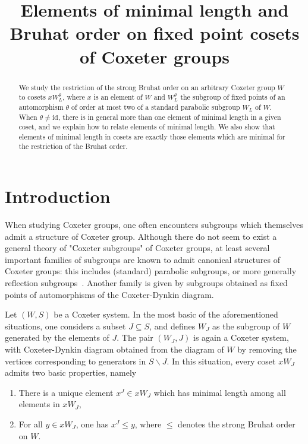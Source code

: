 \documentclass[ALCO, Unicode]{cedram}
\title[Elements of minimal length and Bruhat order on fixed point cosets]{Elements of minimal length and Bruhat order on fixed point cosets of Coxeter groups}
\author{\firstname{Nathan} \lastname{Chapelier-Laget}}
\author{\firstname{Thomas} \lastname{Gobet}}
\begin{document}
\begin{abstract}
We study the restriction of the strong Bruhat order on an arbitrary Coxeter group $W$ to cosets $x W_L^\theta$, where $x$ is an element of $W$ and $W_L^\theta$ the subgroup of fixed points of an automorphism $\theta$ of order at most two of a standard parabolic subgroup $W_L$ of $W$. When $\theta\neq\mathrm{id}$, there is in general more than one element of minimal length in a given coset, and we explain how to relate elements of minimal length. We also show that elements of minimal length in cosets are exactly those elements which are minimal for the restriction of the Bruhat order.  
\end{abstract}

\maketitle


\section{Introduction}

When studying Coxeter groups, one often encounters subgroups which themselves admit a structure of Coxeter group. Although there do not seem to exist a general theory of "Coxeter subgroups" of Coxeter groups, at least several important families of subgroups are known to admit canonical structures of Coxeter groups: this includes (standard) parabolic subgroups, or more generally reflection subgroups~\cite{Deodhar, Dyer_subgroups}. Another family is given by subgroups obtained as fixed points of automorphisms of the Coxeter-Dynkin diagram. 

Let $(W,S)$ be a Coxeter system. In the most basic of the aforementioned situations, one considers a subset $J\subseteq S$, and defines $W_J$ as the subgroup of $W$ generated by the elements of $J$. The pair $(W_J, J)$ is again a Coxeter system, with Coxeter-Dynkin diagram obtained from the diagram of $W$ by removing the vertices corresponding to generators in $S\backslash J$. In this situation, every coset $x W_J$ admits two basic properties, namely
\begin{enumerate}
\item \label{p1}
There is a unique element $x^J\in x W_J$ which has minimal length among all elements in $x W_J$,
\item \label{p2}
For all $y\in x W_J$, one has $x^J \leq y$, where $\leq$ denotes the strong Bruhat order on $W$.
\end{enumerate}
\end{document}

